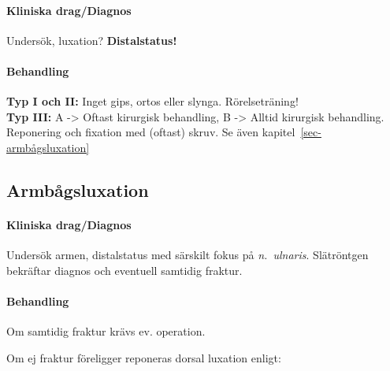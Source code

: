\documentclass[
  letterpaper,
  DIV=11,
  numbers=noendperiod]{scrreport}
\let\oldparagraph\paragraph
\renewcommand{\paragraph}[1]{\oldparagraph{#1}\mbox{}}
\begin{document}
\hypertarget{kliniska-dragdiagnos-2}{%
\paragraph{Kliniska drag/Diagnos}\label{kliniska-dragdiagnos-2}}

Undersök, luxation? \textbf{Distalstatus!}

\hypertarget{behandling-2}{%
\paragraph{Behandling}\label{behandling-2}}

\textbf{Typ I och II:} Inget gips, ortos eller slynga. Rörelseträning!\\
\textbf{Typ III:} A -\textgreater{} Oftast kirurgisk behandling, B
-\textgreater{} Alltid kirurgisk behandling. Reponering och fixation med
(oftast) skruv. Se även kapitel~\ref{sec-armbågsluxation}

\hypertarget{sec-armbuxe5gsluxation}{%
\subsection{Armbågsluxation}\label{sec-armbuxe5gsluxation}}

\hypertarget{kliniska-dragdiagnos-3}{%
\paragraph{Kliniska drag/Diagnos}\label{kliniska-dragdiagnos-3}}

Undersök armen, distalstatus med särskilt fokus på \emph{n.~ulnaris}.
Slätröntgen bekräftar diagnos och eventuell samtidig fraktur.

\hypertarget{behandling-3}{%
\paragraph{Behandling}\label{behandling-3}}

Om samtidig fraktur krävs ev. operation.

Om ej fraktur föreligger reponeras dorsal luxation enligt:
\end{document}
